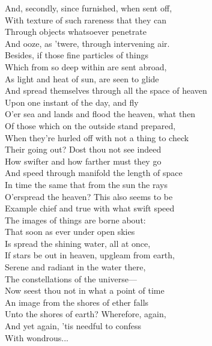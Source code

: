 And, secondly, since furnished, when sent off,\\
With texture of such rareness that they can\\
Through objects whatsoever penetrate\\
And ooze, as 'twere, through intervening air.\\
Besides, if those fine particles of things\\
Which from so deep within are sent abroad,\\
As light and heat of sun, are seen to glide\\
And spread themselves through all the space of heaven\\
Upon one instant of the day, and fly\\
O'er sea and lands and flood the heaven, what then\\
Of those which on the outside stand prepared,\\
When they're hurled off with not a thing to check\\
Their going out? Dost thou not see indeed\\
How swifter and how farther must they go\\
And speed through manifold the length of space\\
In time the same that from the sun the rays\\
O'erspread the heaven? This also seems to be\\
Example chief and true with what swift speed\\
The images of things are borne about:\\
That soon as ever under open skies\\
Is spread the shining water, all at once,\\
If stars be out in heaven, upgleam from earth,\\
Serene and radiant in the water there,\\
The constellations of the universe—\\
Now seest thou not in what a point of time\\
An image from the shores of ether falls\\
Unto the shores of earth? Wherefore, again,\\
And yet again, 'tis needful to confess\\
With wondrous...


